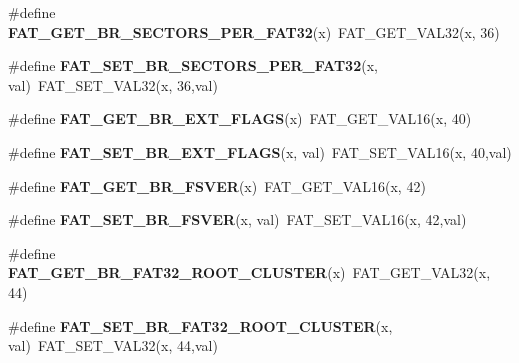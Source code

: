 \begin{DoxyCompactItemize}
\#define {\bfseries F\+A\+T\+\_\+\+G\+E\+T\+\_\+\+B\+R\+\_\+\+S\+E\+C\+T\+O\+R\+S\+\_\+\+P\+E\+R\+\_\+\+F\+A\+T32}(x)~F\+A\+T\+\_\+\+G\+E\+T\+\_\+\+V\+A\+L32(x, 36)
\item 
\mbox{\label{group__libfs__dosfs_ga78c9048c3c288e5bf0c090256c26a7f0}} 
\#define {\bfseries F\+A\+T\+\_\+\+S\+E\+T\+\_\+\+B\+R\+\_\+\+S\+E\+C\+T\+O\+R\+S\+\_\+\+P\+E\+R\+\_\+\+F\+A\+T32}(x,  val)~F\+A\+T\+\_\+\+S\+E\+T\+\_\+\+V\+A\+L32(x, 36,val)
\item 
\mbox{\label{group__libfs__dosfs_gabedd94ab6d4ac4982527e15265a6e9f0}} 
\#define {\bfseries F\+A\+T\+\_\+\+G\+E\+T\+\_\+\+B\+R\+\_\+\+E\+X\+T\+\_\+\+F\+L\+A\+GS}(x)~F\+A\+T\+\_\+\+G\+E\+T\+\_\+\+V\+A\+L16(x, 40)
\item 
\mbox{\label{group__libfs__dosfs_ga8d972d5c07f7b143873fd460353644c1}} 
\#define {\bfseries F\+A\+T\+\_\+\+S\+E\+T\+\_\+\+B\+R\+\_\+\+E\+X\+T\+\_\+\+F\+L\+A\+GS}(x,  val)~F\+A\+T\+\_\+\+S\+E\+T\+\_\+\+V\+A\+L16(x, 40,val)
\item 
\mbox{\label{group__libfs__dosfs_gaad367c0b2e0dc825aefbf997d8a750f3}} 
\#define {\bfseries F\+A\+T\+\_\+\+G\+E\+T\+\_\+\+B\+R\+\_\+\+F\+S\+V\+ER}(x)~F\+A\+T\+\_\+\+G\+E\+T\+\_\+\+V\+A\+L16(x, 42)
\item 
\mbox{\label{group__libfs__dosfs_gab57ef629d7c48d2ad7d589ea4e9652dc}} 
\#define {\bfseries F\+A\+T\+\_\+\+S\+E\+T\+\_\+\+B\+R\+\_\+\+F\+S\+V\+ER}(x,  val)~F\+A\+T\+\_\+\+S\+E\+T\+\_\+\+V\+A\+L16(x, 42,val)
\item 
\mbox{\label{group__libfs__dosfs_ga4c886ed5605e26bc33cedf0e7b85d9be}} 
\#define {\bfseries F\+A\+T\+\_\+\+G\+E\+T\+\_\+\+B\+R\+\_\+\+F\+A\+T32\+\_\+\+R\+O\+O\+T\+\_\+\+C\+L\+U\+S\+T\+ER}(x)~F\+A\+T\+\_\+\+G\+E\+T\+\_\+\+V\+A\+L32(x, 44)
\item 
\mbox{\label{group__libfs__dosfs_ga2cde695988de5c26403941b2a715b1fa}} 
\#define {\bfseries F\+A\+T\+\_\+\+S\+E\+T\+\_\+\+B\+R\+\_\+\+F\+A\+T32\+\_\+\+R\+O\+O\+T\+\_\+\+C\+L\+U\+S\+T\+ER}(x,  val)~F\+A\+T\+\_\+\+S\+E\+T\+\_\+\+V\+A\+L32(x, 44,val)
\item 
\mbox{\label{group__libfs__dosfs_gab3017271fb8ce0c21a7be9f72a9d4d82}} 

\end{DoxyCompactItemize}
